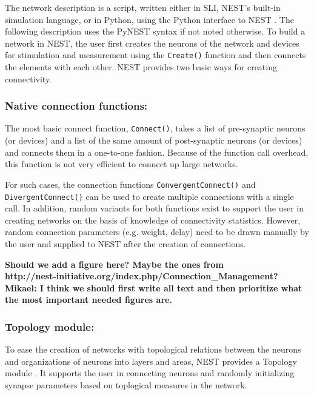 \documentclass{frontiersSCNS} %
\newcommand{\tbw}[1]{{\bf\parindent0pt\color{red}#1}}
\begin{document}
The network description is a script, written either in SLI, NEST's
built-in simulation language, or in Python, using the Python interface
to NEST \citep[PyNEST;][]{Eppler09_12}. The following description uses
the PyNEST syntax if not noted otherwise. To build a network in NEST,
the user first creates the neurons of the network and devices for
stimulation and measurement using the \texttt{Create()} function and
then connects the elements with each other. NEST provides two basic
ways for creating connectivity.

\subsubsection*{Native connection functions:}

The most basic connect function, \texttt{Connect()}, takes a list of
pre-synaptic neurons (or devices) and a list of the same amount of
post-synaptic neurons (or devices) and connects them in a one-to-one
fashion. Because of the function call overhead, this function is not
very efficient to connect up large networks.

For such cases, the connection functions \texttt{ConvergentConnect()}
and \texttt{DivergentConnect()} can be used to create multiple
connections with a single call. In addition, random variants for both
functions exist to support the user in creating networks on the basis
of knowledge of connectivity statistics. However, random connection
parameters (e.g. weight, delay) need to be drawn manually by the user
and supplied to NEST after the creation of connections.

\tbw{Should we add a figure here? Maybe the ones
  from\\ http://nest-initiative.org/index.php/Connection\_Management?\\
Mikael: I think we should first write all text and then prioritize
what the most important needed figures are.}

\subsubsection*{Topology module:}

To ease the creation of networks with topological relations between
the neurons and organizations of neurons into layers and areas, NEST
provides a Topology module \citep{Plesser_13}. It supports the user in
connecting neurons and randomly initializing synapse parameters based
on toplogical measures in the network.
\end{document}
